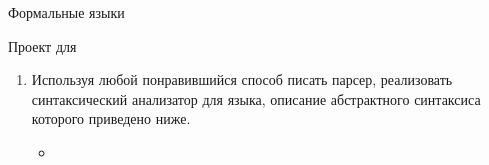 \documentclass[12pt]{article}
\begin{document}
\begin{center}
{\LARGE Формальные языки}

{\Large Проект для }

\end{center}

\bigskip

\begin{enumerate}
  \item {Используя любой понравившийся способ писать парсер, реализовать синтаксический анализатор для языка, описание абстрактного синтаксиса которого приведено ниже.}
  \begin{itemize}
    \item
  \end{itemize}

\end{enumerate}



\bigskip


\end{document}
